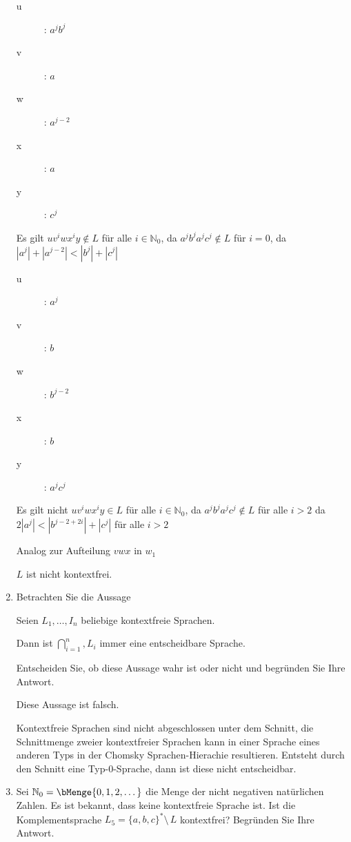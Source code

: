 \documentclass{bschlangaul-aufgabe}
\begin{document}
\begin{enumerate}
\begin{bAntwort}
\begin{description}
\item[u]: $a^j b^j$
\item[v]: $a$
\item[w]: $a^{j - 2}$
\item[x]: $a$
\item[y]: $c^j$
\end{description}

Es gilt $uv^iwx^iy \notin L$ für alle $i \in \mathbb{N}_0$, da $a^j
b^j a^j c^j \notin L$ für $i = 0$, da
$|a^j| + |a^{j-2}| < |b^j| + |c^j|$


\begin{description}
\item[u]: $a^j$
\item[v]: $b$
\item[w]: $b^{j - 2}$
\item[x]: $b$
\item[y]: $a^j c^j$
\end{description}

Es gilt nicht $uv^iwx^iy \in L$ für alle $i \in \mathbb{N}_0$, da $a^j
b^j a^j c^j \notin L$ für alle $i > 2$ da
$2|a^j| < |b^{j - 2 + 2i}| + |c^j|$ für alle $i > 2$


Analog zur Aufteilung $vwx$ in $w_1$

\Rightarrow $L$ ist nicht kontextfrei.
\end{bAntwort}


\item Betrachten Sie die Aussage

\bigskip

\centerline{Seien $L_1, \dots, I_n$ beliebige kontextfreie Sprachen.}

\centerline{Dann ist $\bigcap_{i=1}^n, L_i$ immer eine entscheidbare
Sprache.}

\bigskip

Entscheiden Sie, ob diese Aussage wahr ist oder nicht und begründen Sie
Ihre Antwort.

\begin{bAntwort}
Diese Aussage ist falsch.

Kontextfreie Sprachen sind nicht abgeschlossen unter dem Schnitt, \dh
die Schnittmenge zweier kontextfreier Sprachen kann in einer Sprache
eines anderen Typs in der Chomsky Sprachen-Hierachie resultieren.
Entsteht durch den Schnitt eine Typ-0-Sprache, dann ist diese nicht
entscheidbar.
\end{bAntwort}


\item Sei $\mathbb{N}_0 = \bMenge{0,1,2,\dots}$ die Menge der nicht
negativen natürlichen Zahlen. Es ist bekannt, dass  keine kontextfreie Sprache ist. Ist die
Komplementsprache $L_5 = \{a, b, c \}^* \setminus \, L$ kontextfrei?
Begründen Sie Ihre Antwort.

\end{enumerate}
\end{document}
